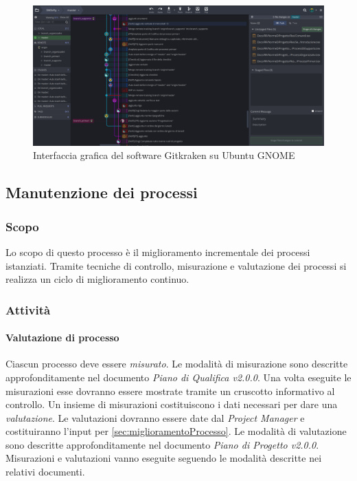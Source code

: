 \begin{figure}[H]
	\centering
	\includegraphics[width=1\textwidth]{Images/gitkraken.png}
	\caption{Interfaccia grafica del software Gitkraken su Ubuntu GNOME}
\end{figure}

\subsection{Manutenzione dei processi}
\label{sec:manutenzioneProcessi}
\subsubsection{Scopo}
Lo scopo di questo processo è il miglioramento incrementale dei processi istanziati. Tramite tecniche di controllo, misurazione e valutazione dei processi si realizza un ciclo di miglioramento continuo.

\subsubsection{Attività}
	\paragraph{Valutazione di processo} \Spazio
	Ciascun processo deve essere \emph{misurato}. Le modalità di misurazione sono descritte approfonditamente nel documento \emph{Piano di Qualifica v2.0.0}. 
	Una volta eseguite le misurazioni esse dovranno essere mostrate tramite un cruscotto informativo al controllo. Un insieme di misurazioni costituiscono i dati necessari per dare una \emph{valutazione}. Le valutazioni dovranno essere date dal \emph{Project Manager} e costituiranno l'input per \ref{sec:miglioramentoProcesso}. Le modalità di valutazione sono descritte approfonditamente nel documento \emph{Piano di Progetto v2.0.0}. Misurazioni e valutazioni vanno eseguite seguendo le modalità descritte nei relativi documenti.

